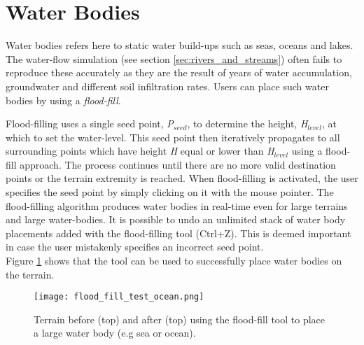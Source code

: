 \section{Water Bodies} \label{sec:water_bodies}

Water bodies refers here to static water build-ups such as seas, oceans and lakes. The water-flow simulation (see section \ref{sec:rivers_and_streams}) often fails to reproduce these accurately as they are the result of years of water accumulation, groundwater and different soil infiltration rates. Users can place such water bodies by using a \textit{flood-fill}.

Flood-filling uses a single seed point, \textit{P$_{seed}$}, to determine the height, \textit{H$_{level}$}, at which to set the water-level. This seed point then iteratively propagates to all surrounding points which have height \textit{H} equal or lower than \textit{H$_{level}$} using a flood-fill approach. The process continues until there are no more valid destination points or the terrain extremity is reached. When flood-filling is activated, the user specifies the seed point by simply clicking on it with the mouse pointer. The flood-filling algorithm produces water bodies in real-time even for large terrains and large water-bodies. It is possible to undo an unlimited stack of water body placements added with the flood-filling tool (Ctrl+Z). This is deemed important in case the user mistakenly specifies an incorrect seed point. \\

Figure \ref{fig:flood_fill_test} shows that the tool can be used to successfully place water bodies on the terrain.

\begin{figure}
\center
	\texttt{[image: flood\_fill\_test\_ocean.png]}
	\caption{ Terrain before (top) and after (top) using the flood-fill tool to place a large water body (e.g sea or ocean). }	
	\label{fig:flood_fill_test}
\end{figure}
